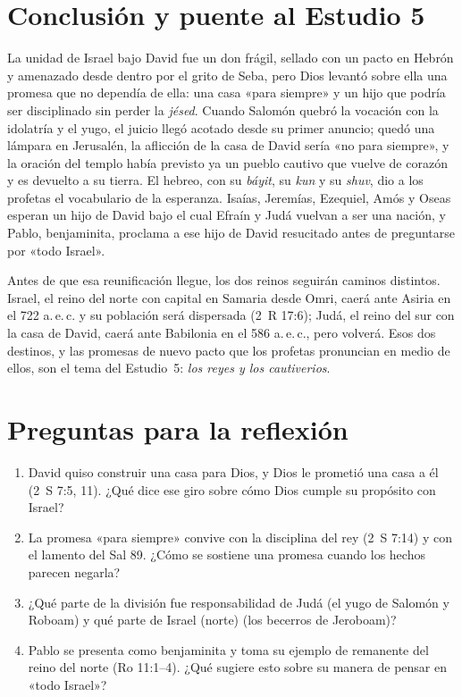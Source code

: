 \section{Conclusión y puente al Estudio 5}

La unidad de Israel bajo David fue un don frágil, sellado con un pacto en Hebrón y amenazado desde dentro por el grito de Seba, pero Dios levantó sobre ella una promesa que no dependía de ella: una casa «para siempre» y un hijo que podría ser disciplinado sin perder la \emph{jésed}. Cuando Salomón quebró la vocación con la idolatría y el yugo, el juicio llegó acotado desde su primer anuncio; quedó una lámpara en Jerusalén, la aflicción de la casa de David sería «no para siempre», y la oración del templo había previsto ya un pueblo cautivo que vuelve de corazón y es devuelto a su tierra. El hebreo, con su \emph{báyit}, su \emph{kun} y su \emph{shuv}, dio a los profetas el vocabulario de la esperanza. Isaías, Jeremías, Ezequiel, Amós y Oseas esperan un hijo de David bajo el cual Efraín y Judá vuelvan a ser una nación, y Pablo, benjaminita, proclama a ese hijo de David resucitado antes de preguntarse por «todo Israel».

Antes de que esa reunificación llegue, los dos reinos seguirán caminos distintos. Israel, el reino del norte con capital en Samaria desde Omri, caerá ante Asiria en el 722 a.\,e.\,c. y su población será dispersada (2~R 17:6); Judá, el reino del sur con la casa de David, caerá ante Babilonia en el 586 a.\,e.\,c., pero volverá. Esos dos destinos, y las promesas de nuevo pacto que los profetas pronuncian en medio de ellos, son el tema del Estudio~5: \emph{los reyes y los cautiverios}.

\section*{Preguntas para la reflexión}
\begin{enumerate}
\item David quiso construir una casa para Dios, y Dios le prometió una casa a él (2~S 7:5, 11). ¿Qué dice ese giro sobre cómo Dios cumple su propósito con Israel?
\item La promesa «para siempre» convive con la disciplina del rey (2~S 7:14) y con el lamento del Sal 89. ¿Cómo se sostiene una promesa cuando los hechos parecen negarla?
\item ¿Qué parte de la división fue responsabilidad de Judá (el yugo de Salomón y Roboam) y qué parte de Israel (norte) (los becerros de Jeroboam)?
\item Pablo se presenta como benjaminita y toma su ejemplo de remanente del reino del norte (Ro 11:1--4). ¿Qué sugiere esto sobre su manera de pensar en «todo Israel»?
\end{enumerate}

